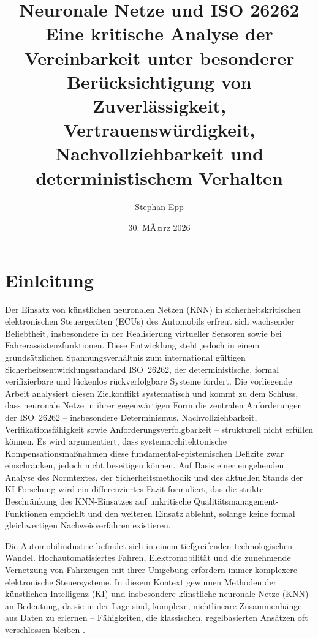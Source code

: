 ﻿\documentclass[12pt,a4paper]{article}
\title{
  {\bfseries Neuronale Netze und ISO 26262}\\
  {\Large Eine kritische Analyse der Vereinbarkeit unter besonderer Ber\"ucksichtigung von Zuverl\"assigkeit, Vertrauensw\"urdigkeit, Nachvollziehbarkeit und deterministischem Verhalten}}
\author{Stephan Epp}
\date{30. MÃ¤rz 2026}
\begin{document}
\maketitle
\tableofcontents
\newpage

\section{Einleitung}
\label{sec:einleitung}
Der Einsatz von k\"unstlichen neuronalen Netzen (KNN) in sicherheitskritischen
elektronischen Steuerger\"aten (ECUs) des Automobils erfreut sich wachsender
Beliebtheit, insbesondere in der Realisierung virtueller Sensoren sowie bei
Fahrerassistenzfunktionen. Diese Entwicklung steht jedoch in einem grunds\"atzlichen
Spannungsverh\"altnis zum international g\"ultigen Sicherheitsentwicklungsstandard
ISO~26262, der deterministische, formal verifizierbare und l\"uckenlos r\"uckverfolgbare
Systeme fordert. Die vorliegende Arbeit analysiert diesen Zielkonflikt systematisch und
kommt zu dem Schluss, dass neuronale Netze in ihrer gegenw\"artigen Form die zentralen
Anforderungen der ISO~26262 -- insbesondere Determinismus, Nachvollziehbarkeit,
Verifikationsf\"ahigkeit sowie Anforderungsverfolgbarkeit -- strukturell nicht erf\"ullen
k\"onnen. Es wird argumentiert, dass systemarchitektonische
Kompensationsma\ss{}nahmen diese fundamental-epistemischen Defizite zwar
einschr\"anken, jedoch nicht beseitigen k\"onnen. Auf Basis einer eingehenden
Analyse des Normtextes, der Sicherheitsmethodik und des aktuellen Stands der
KI-Forschung wird ein differenziertes Fazit formuliert, das die strikte
Beschr\"ankung des KNN-Einsatzes auf unkritische Qualit\"atsmanagement-Funktionen
empfiehlt und den weiteren Einsatz ablehnt, solange keine formal gleichwertigen
Nachweisverfahren existieren.

Die Automobilindustrie befindet sich in einem tiefgreifenden technologischen Wandel.
Hochautomatisiertes Fahren, Elektromobilit\"at und die zunehmende Vernetzung von
Fahrzeugen mit ihrer Umgebung erfordern immer komplexere elektronische Steuersysteme.
In diesem Kontext gewinnen Methoden der k\"unstlichen Intelligenz (KI) und insbesondere
k\"unstliche neuronale Netze (KNN) an Bedeutung, da sie in der Lage sind, komplexe,
nichtlineare Zusammenh\"ange aus Daten zu erlernen -- F\"ahigkeiten, die klassischen,
regelbasierten Ans\"atzen oft verschlossen bleiben \cite{LeCun2015}.
\end{document}
